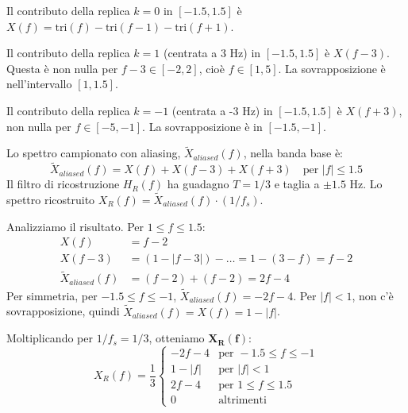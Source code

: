 \begin{soluzione}{24}
\begin{enumerate}
        Il contributo della replica $k=0$ in $[-1.5, 1.5]$ è $X(f) = \text{tri}(f) - \text{tri}(f-1) - \text{tri}(f+1)$.
        
        Il contributo della replica $k=1$ (centrata a 3 Hz) in $[-1.5, 1.5]$ è $X(f-3)$. Questa è non nulla per $f-3 \in [-2, 2]$, cioè $f \in [1, 5]$. La sovrapposizione è nell'intervallo $[1, 1.5]$.
        
        Il contributo della replica $k=-1$ (centrata a -3 Hz) in $[-1.5, 1.5]$ è $X(f+3)$, non nulla per $f \in [-5, -1]$. La sovrapposizione è in $[-1.5, -1]$.
        
        Lo spettro campionato con aliasing, $\tilde{X}_{aliased}(f)$, nella banda base è:
        \[
            \tilde{X}_{aliased}(f) = X(f) + X(f-3) + X(f+3) \quad \text{per } |f| \le 1.5
        \]
        Il filtro di ricostruzione $H_R(f)$ ha guadagno $T=1/3$ e taglia a $\pm 1.5$ Hz.
        Lo spettro ricostruito $X_R(f) = \tilde{X}_{aliased}(f) \cdot (1/f_s)$.
        
        Analizziamo il risultato. Per $1 \le f \le 1.5$:
        \begin{align*}
            X(f) &= f-2 \\
            X(f-3) &= (1-|f-3|) - \dots = 1-(3-f) = f-2 \\
            \tilde{X}_{aliased}(f) &= (f-2) + (f-2) = 2f-4
        \end{align*}
        Per simmetria, per $-1.5 \le f \le -1$, $\tilde{X}_{aliased}(f) = -2f-4$.
        Per $|f|<1$, non c'è sovrapposizione, quindi $\tilde{X}_{aliased}(f)=X(f)=1-|f|$.
        
        Moltiplicando per $1/f_s=1/3$, otteniamo $\mathbf{X_R(f)}$:
        \[
            X_R(f) = \frac{1}{3} \begin{cases} -2f-4 & \text{per } -1.5 \le f \le -1 \\ 1-|f| & \text{per } |f|<1 \\ 2f-4 & \text{per } 1 \le f \le 1.5 \\ 0 & \text{altrimenti} \end{cases}
        \]
    \end{enumerate}
\end{soluzione}